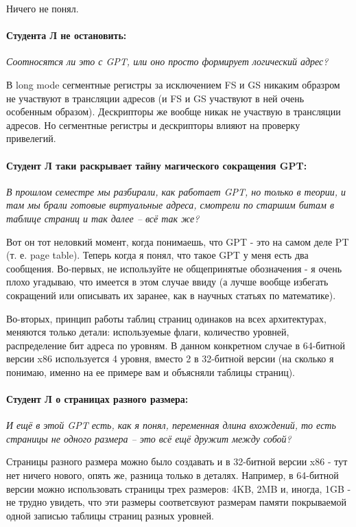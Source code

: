 Ничего не понял.

\paragraph{Студента Л не остановить:}
\emph{Соотносятся ли это с GPT, или оно просто формирует логический адрес?}

В long mode сегментные регистры за исключением FS и GS никаким образром не
участвуют в трансляции адресов (и FS и GS участвуют в ней очень особенным
образом). Дескрипторы же вообще никак не участвую в трансляции адресов. Но
сегментные регистры и дескрипторы влияют на проверку привелегий.

\paragraph{Студент Л таки раскрывает тайну магического сокращения GPT:}
\emph{В прошлом семестре мы разбирали, как работает GPT, но только в теории, и
там мы брали готовые виртуальные адреса, смотрели по старшим битам в таблице
страниц и так далее -- всё так же?}

Вот он тот неловкий момент, когда понимаешь, что GPT - это на самом деле PT (т.
е. page table). Теперь когда я понял, что такое GPT у меня есть два сообщения.
Во-первых, не используйте не общепринятые обозначения - я очень плохо угадываю,
что имеется в этом случае ввиду (а лучше вообще избегать сокращений или
описывать их заранее, как в научных статьях по математике).

Во-вторых, принцип работы таблиц страниц одинаков на всех архитектурах,
меняются только детали: используемые флаги, количество уровней, распределение
бит адреса по уровням. В данном конкретном случае в 64-битной версии x86
используется 4 уровня, вместо 2 в 32-битной версии (на сколько я понимаю, именно
на ее примере вам и объясняли таблицы страниц).

\paragraph{Студент Л о страницах разного размера:}
\emph{И ещё в этой GPT есть, как я понял, переменная длина вхождений, то есть
страницы не одного размера -- это всё ещё дружит между собой?}

Страницы разного размера можно было создавать и в 32-битной версии x86 - тут нет
ничего нового, опять же, разница только в деталях. Например, в 64-битной версии
можно использовать страницы трех размеров: 4KB, 2MB и, иногда, 1GB - не трудно
увидеть, что эти размеры соответсвуют размерам памяти покрываемой одной записью
таблицы страниц разных уровней.

